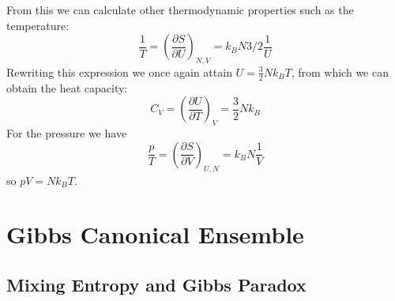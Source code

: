 \documentclass[12pt, a4paper, oneside, openright, titlepage]{book}
\begin{document}
From this we can calculate other thermodynamic properties such as the temperature: \begin{equation*}
    \frac{1}{T} = \left(\frac{\partial S}{\partial U}\right)_{N,V} = k_BN3/2\frac{1}{U}
\end{equation*}
Rewriting this expression we once again attain $U = \frac{3}{2}Nk_BT$, from which we can obtain the heat capacity: \begin{equation*}
    C_V = \left(\frac{\partial U}{\partial T}\right)_V = \frac{3}{2}Nk_B
\end{equation*}
For the pressure we have \begin{equation*}
    \frac{p}{T} = \left(\frac{\partial S}{\partial V}\right)_{U,N} = k_BN\frac{1}{V}
\end{equation*}
so $pV = Nk_BT$.




\chapter{Gibbs Canonical Ensemble}


\section{Mixing Entropy and Gibbs Paradox}
\end{document}
